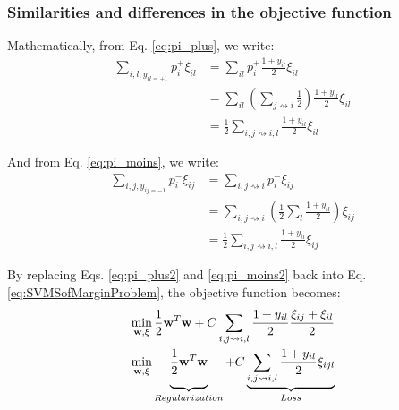 \subsubsection{Similarities and differences in the objective function}
\label{sec:relationship}

\noindent Mathematically, from Eq. \ref{eq:pi_plus}, we write:
\begin{align}
	\sum\limits_{i,l,y_{il=+1}}p_i^+\xi_{il} 
	& = 
	\sum_{il}p_i^+   \frac{1+y_{il}}{2}  \xi_{il} \nonumber\\
	& = 
	\sum_{il} \left( \sum_{j \rightsquigarrow i} \frac{1}{2}\right)  \frac{1+y_{il}}{2}  \xi_{il} \nonumber\\
	& =
	\frac{1}{2}\sum_{i,j \rightsquigarrow i, l} \frac{1+y_{il}}{2}\xi_{il} \label{eq:pi_plus2}
\end{align}

\noindent And from Eq. \ref{eq:pi_moins}, we write:
\begin{align}
	\sum\limits_{i,j, y_{ij=-1}}p_i^-\xi_{ij} 
	& = 
	\sum_{i,j \rightsquigarrow i}p_i^-\xi_{ij} \nonumber \\
	& =
	\sum_{i,j \rightsquigarrow i} \left( \frac{1}{2}\sum_l \frac{1+y_{il}}{2} \right) \xi_{ij} \nonumber \\
	& =
	\frac{1}{2}\sum_{i,j \rightsquigarrow i, l} \frac{1+y_{il}}{2}\xi_{ij} \label{eq:pi_moins2}
\end{align}

\noindent By replacing Eqs. \ref{eq:pi_plus2} and \ref{eq:pi_moins2} back into Eq. \ref{eq:SVMSofMarginProblem}, the objective function becomes:
\begin{align}
	&\displaystyle \min_{\textbf{w},\xi} 
	\frac{1}{2}\textbf{w}^T \textbf{w}
	+ C\sum_{i,j \rightsquigarrow i ,l}\frac{1+y_{il}}{2}\frac{\xi_{ij}+\xi_{il}}{2} \nonumber \\
	&\displaystyle \min_{\textbf{w},\xi} 
	\underbrace{ 
		\vphantom{ \sum\limits_{i,j \rightsquigarrow i,l} }
		\frac{1}{2}\textbf{w}^T \textbf{w}
	}_{Regularization}
	+ C \underbrace{
		\sum_{i,j \rightsquigarrow i ,l}
		\frac{1+y_{il}}{2} \xi_{ijl} 
	}_{Loss}
	\label{eq:svm2}
\end{align}	
%


